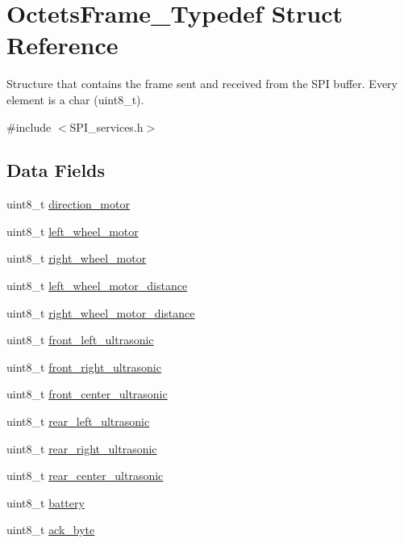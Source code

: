 \hypertarget{struct_octets_frame___typedef}{}\section{Octets\+Frame\+\_\+\+Typedef Struct Reference}
\label{struct_octets_frame___typedef}


Structure that contains the frame sent and received from the S\+PI buffer. Every element is a char (uint8\+\_\+t).  




{\ttfamily \#include $<$S\+P\+I\+\_\+services.\+h$>$}

\subsection*{Data Fields}
\begin{DoxyCompactItemize}
\item 
uint8\+\_\+t \hyperlink{struct_octets_frame___typedef_ab22e09e343196c1788780558d9e5a0ae}{direction\+\_\+motor}
\item 
uint8\+\_\+t \hyperlink{struct_octets_frame___typedef_a4c672398a89e5cf0164324a00183f922}{left\+\_\+wheel\+\_\+motor}
\item 
uint8\+\_\+t \hyperlink{struct_octets_frame___typedef_a27591501debf6e6053f7c3e376e5aa49}{right\+\_\+wheel\+\_\+motor}
\item 
uint8\+\_\+t \hyperlink{struct_octets_frame___typedef_ae15b87c890164bce27eb5f2607e64a25}{left\+\_\+wheel\+\_\+motor\+\_\+distance}
\item 
uint8\+\_\+t \hyperlink{struct_octets_frame___typedef_ac68f226c7529335c37f27cd95aedff32}{right\+\_\+wheel\+\_\+motor\+\_\+distance}
\item 
uint8\+\_\+t \hyperlink{struct_octets_frame___typedef_a0544c5e77443611e9c54c911f20e7504}{front\+\_\+left\+\_\+ultrasonic}
\item 
uint8\+\_\+t \hyperlink{struct_octets_frame___typedef_a58a01cc5d9578f22926385389b670bf8}{front\+\_\+right\+\_\+ultrasonic}
\item 
uint8\+\_\+t \hyperlink{struct_octets_frame___typedef_a6131a734576ec72a5975546ac9e6c004}{front\+\_\+center\+\_\+ultrasonic}
\item 
uint8\+\_\+t \hyperlink{struct_octets_frame___typedef_a8007022ee9ef4013b0cd17c8fea23d35}{rear\+\_\+left\+\_\+ultrasonic}
\item 
uint8\+\_\+t \hyperlink{struct_octets_frame___typedef_a28e44c9de4ac244a8450095ae356e345}{rear\+\_\+right\+\_\+ultrasonic}
\item 
uint8\+\_\+t \hyperlink{struct_octets_frame___typedef_aa211e19d6c5a23b9eca397d4818e93fc}{rear\+\_\+center\+\_\+ultrasonic}
\item 
uint8\+\_\+t \hyperlink{struct_octets_frame___typedef_a89e04157c4e1f65c9ab63bffa365c8a6}{battery}
\item 
uint8\+\_\+t \hyperlink{struct_octets_frame___typedef_a5325932c177cc46a55ff3810195fc974}{ack\+\_\+byte}
\end{DoxyCompactItemize}


